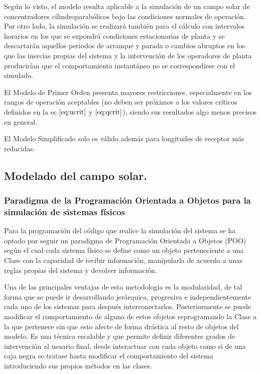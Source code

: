 Según lo visto, el modelo resulta aplicable a la simulación de un campo
solar de concentradores cilindroparabólicos bajo las condiciones
normales de operación. Por otro lado, la simulación se realizará también
para el cálculo con intervalos horarios en los que se supondrá
condiciones estacionarias de planta y se descartarán aquellos periodos
de arranque y parada o cambios abruptos en los que las inercias propias
del sistema y la intervención de los operadores de planta producirían
que el comportamiento instantáneo no se correspondiese con el simulado.

El Modelo de Primer Orden presenta mayores restricciones, especialmente
en los rangos de operación aceptables (no deben ser próximos a los
valores críticos definidos en la ec.\(\eqref{eq:ucrit}\) y
\(\eqref{eq:qcrit}\)), siendo sus resultados algo menos precisos en
general.

El Modelo Simplificado solo es válido además para longitudes de receptor
más reducidas.

    \hypertarget{modelado-del-campo-solar.}{%
\subsection{Modelado del campo solar.}\label{modelado-del-campo-solar.}}

\hypertarget{paradigma-de-la-programaciuxf3n-orientada-a-objetos-para-la-simulaciuxf3n-de-sistemas-fuxedsicos}{%
\subsubsection{Paradigma de la Programación Orientada a Objetos para la
simulación de sistemas
físicos}\label{paradigma-de-la-programaciuxf3n-orientada-a-objetos-para-la-simulaciuxf3n-de-sistemas-fuxedsicos}}

Para la programación del código que realice la simulación del sistema se
ha optado por seguir un paradigma de Programación Orientada a Objetos
(POO) según el cual cada sistema físico se define como un objeto
perteneciente a una Clase con la capacidad de recibir información,
manipularla de acuerdo a unas reglas propias del sistema y devolver
información.

Una de las principales ventajas de esta metodología es la modularidad,
de tal forma que se puede ir desarrollando jerárquica, progresiva e
independientemente cada uno de los sistemas para después
interconectarlos. Posteriormente se puede modificar el comportamiento de
alguno de estos objetos reprogramando la Clase a la que pertenece sin
que esto afecte de forma drástica al resto de objetos del modelo. Es una
técnica escalable y que permite definir diferentes grados de
intervención al usuario final, desde interactuar con cada objeto como si
de una caja negra se tratase hasta modificar el comportamiento del
sistema introduciendo sus propios métodos en las clases.

